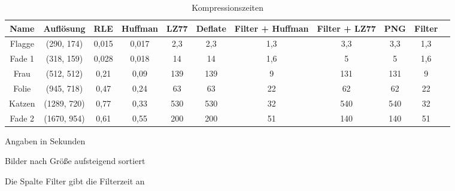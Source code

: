 \documentclass[conference]{IEEEtran}
\begin{document}
\begin{table}
    \renewcommand*{\arraystretch}{1.1}
    \centering
    \begin{threeparttable}
      \caption{Kompressionszeiten}
      \label{tab:kompzeiten}
        \begin{tabular}{c *9{c} S[table-format=5.9]}

        \toprule
        Name    &  Auflösung  & RLE   & Huffman   & LZ77  & Deflate   & Filter + Huffman  & Filter + LZ77     & PNG   & Filter\\
        \midrule
        Flagge  & (290, 174)  & 0,015 & 0,017     & 2,3   & 2,3       & 1,3               & 3,3               & 3,3   & 1,3       \\
        Fade 1  & (318, 159)  & 0,028 & 0,018     & 14    & 14        & 1,6               & 5                 & 5     & 1,6       \\
        Frau    & (512, 512)  & 0,21  & 0,09      & 139   & 139       & 9                 & 131               & 131   & 9         \\
        Folie   & (945, 718)  & 0,47  & 0,24      & 63    & 63        & 22                & 62                & 62    & 22        \\
        Katzen  & (1289, 720) & 0,77  & 0,33      & 530   & 530       & 32                & 540               & 540   & 32        \\ 
        Fade 2  & (1670, 954) & 0,61  & 0,55      & 200   & 200       & 51                & 140               & 140   & 51        
      \end{tabular}
      \par{} Angaben in Sekunden
      \par{} Bilder nach Größe aufsteigend sortiert
      \par{} Die Spalte Filter gibt die Filterzeit an
    \end{threeparttable}
  \end{table}
\end{document}
